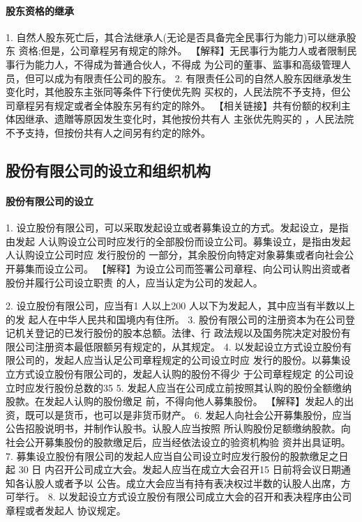 \documentclass[UTF8,12pt]{ctexart}
\numberwithin{equation}{section} %
\numberwithin{figure}{section}
\numberwithin{table}{section}
\begin{document}
	
	\paragraph{股东资格的继承}
	1. 自然人股东死亡后，其合法继承人(无论是否具备完全民事行为能力)可以继承股东 资格;但是，公司章程另有规定的除外。
	【解释】无民事行为能力人或者限制民事行为能力人，不得成为普通合伙人，不得成 为公司的董事、监事和高级管理人员，但可以成为有限责任公司的股东。
	2. 有限责任公司的自然人股东因继承发生变化时，其他股东主张同等条件下行使优先购 买权的，人民法院不予支持，但公司章程另有规定或者全体股东另有约定的除外。
	【相关链接】共有份额的权利主体因继承、遗贈等原因发生变化时，其他按份共有人 主张优先购买的 ，人民法院不予支持，但按份共有人之间另有约定的除外。
	
	\subsection{股份有限公司的设立和组织机构}
	\paragraph{股份有限公司的设立}
	1. 设立股份有限公司，可以采取发起设立或者募集设立的方式。发起设立，是指由发起 人认购设立公司时应发行的全部股份而设立公司。募集设立，是指由发起人认购设立公司时应 发行股份的 一部分，其余股份向特定对象募集或者向社会公开募集而设立公司。
	【解释】为设立公司而签署公司章程、向公司认购出资或者股份并履行公司设立职责 的人，应当认定为公司的发起人。
	
	2. 设立股份有限公司，应当有1 人以上200 人以下为发起人，其中应当有半数以上的发 起人在中华人民共和国境内有住所。
	3. 股份有限公司的注册资本为在公司登记机关登记的已发行股份的股本总额。法律、行 政法规以及国务院决定对股份有限公司注册资本最低限额另有规定的，从其规定。
	4. 以发起设立方式设立股份有限公司的，发起人应当认足公司章程规定的公司设立时应 发行的股份。以募集设立方式设立股份有限公司的，发起人认购的股份不得少 于公司章程规定 的公司设立时应发行股份总数的35%
	5. 发起人应当在公司成立前按照其认购的股份全额缴纳股款。在发起人认购的股份缴足 前，不得向他人募集股份。
	【解释】发起人的出资，既可以是货币，也可以是非货币财产。
	6. 发起人向社会公开募集股份，应当公告招股说明书，并制作认股书。认股人应当按照 所认购股份足额缴纳股款。向社会公开募集股份的股款缴足后，应当经依法设立的验资机构验 资并出具证明。
	7. 募集设立股份有限公司的发起人应当自公司设立时应发行股份的股款缴足之日起 30 日 内召开公司成立大会。发起人应当在成立大会召开15 日前将会议日期通知各认股人或者予以 公告。成立大会应当有持有表决权过半数的认股人出席，方可举行。
	8. 以发起设立方式设立股份有限公司成立大会的召开和表决程序由公司章程或者发起人 协议规定。
	
\end{document}
